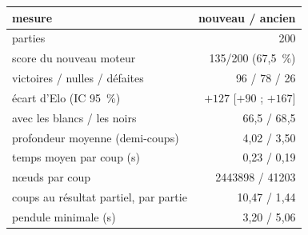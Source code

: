 \begin{tabular}{lr}
\toprule
mesure & nouveau / ancien\\
\midrule
parties & 200\\
score du nouveau moteur & 135/200 (67{,}5~\%)\\
victoires / nulles / défaites & 96 / 78 / 26\\
écart d'Elo (IC 95~\%) & $+127$ [$+90$ ; $+167$]\\
avec les blancs / les noirs & 66{,}5 / 68{,}5\\
profondeur moyenne (demi-coups) & 4{,}02 / 3{,}50\\
temps moyen par coup (s) & 0{,}23 / 0{,}19\\
nœuds par coup & 2443898 / 41203\\
coups au résultat partiel, par partie & 10{,}47 / 1{,}44\\
pendule minimale (s) & 3{,}20 / 5{,}06\\
\bottomrule
\end{tabular}
